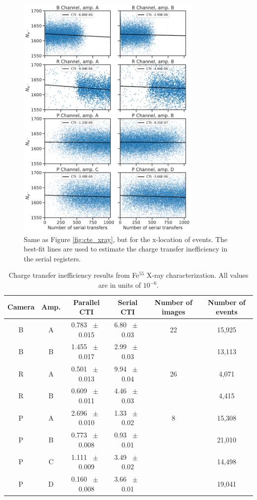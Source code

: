\begin{figure}[htbp]
    \centering
    \includegraphics[width=0.8\textwidth]{figures/cte/xray_cte_serial.pdf}
    \caption{Same as Figure \ref{fig:cte_xray}, but for the x-location of events. The best-fit lines are used to estimate the charge transfer inefficiency in the serial registers.}
    \label{fig:cte_xray_serial}
\end{figure}

\begin{table}[htbp]
    \centering
    \begin{tabular}{cccccc}\toprule
        Camera & Amp. & Parallel CTI & Serial CTI & Number of images & Number of events \\\midrule
        B & A &0.783 $\;\pm\;$ 0.015 & 6.80 $\;\pm\;$ 0.03 & 22 & 15,925 \\
        B & B &1.455 $\;\pm\;$ 0.017 & 2.99 $\;\pm\;$ 0.03 &  & 13,113 \\\midrule
        R & A &0.501 $\;\pm\;$ 0.013 & 9.94 $\;\pm\;$ 0.04 & 26 & 4,071 \\
        R & B &0.609 $\;\pm\;$ 0.011 & 4.46 $\;\pm\;$ 0.03 &  & 4,415 \\\midrule
        P & A &2.696 $\;\pm\;$ 0.010 & 1.33 $\;\pm\;$ 0.02 & 8 & 15,308 \\
        P & B &0.773 $\;\pm\;$ 0.008 & 0.93 $\;\pm\;$ 0.01 &  & 21,010 \\
        P & C &1.111 $\;\pm\;$ 0.009 & 3.49 $\;\pm\;$ 0.02 &  & 14,498 \\
        P & D &0.160 $\;\pm\;$ 0.008 & 3.66 $\;\pm\;$ 0.01 &  & 19,041 \\
    \end{tabular}
    \caption{Charge transfer inefficiency results from Fe$^{55}$ X-ray characterization. All values are in units of $10^{-6}$.}
    \label{tab:cte_xray}
\end{table}

